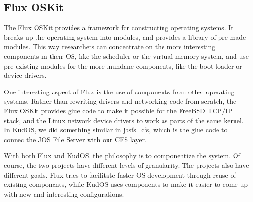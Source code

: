 \subsection{Flux OSKit}

The Flux OSKit \cite{ford97oskit} provides a framework for constructing
operating systems. It breaks up the operating system into modules, and provides
a library of pre-made modules. This way researchers can concentrate on the more
interesting components in their OS, like the scheduler or the virtual memory
system, and use pre-existing modules for the more mundane components, like the
boot loader or device drivers.

One interesting aspect of Flux is the use of components from other operating
systems. Rather than rewriting drivers and networking code from scratch, the
Flux OSKit provides glue code to make it possible for the FreeBSD TCP/IP stack,
and the Linux network device drivers to work as parts of the same kernel. In
KudOS, we did something similar in josfs\_cfs, which is the glue code to connec
the JOS File Server with our CFS layer.

With both Flux and KudOS, the philosophy is to componentize the system. Of
course, the two projects have different levels of granularity. The projects also
have different goals. Flux tries to facilitate faster OS development through
reuse of existing components, while KudOS uses components to make it easier to
come up with new and interesting configurations.
